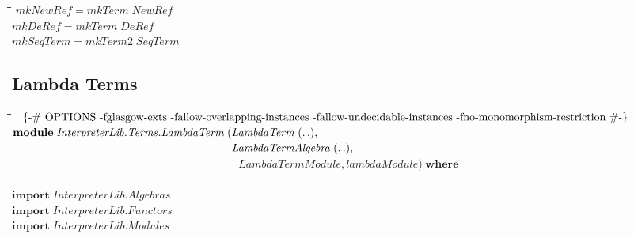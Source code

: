 \documentclass[10pt]{article}
\newlength{\lwidth}\setlength{\lwidth}{4.5cm}
\newlength{\cwidth}\setlength{\cwidth}{8mm} %
\newcommand{\Conid}[1]{\mathit{#1}}
\newcommand{\Varid}[1]{\mathit{#1}}
\begin{document}
\begin{tabbing}
\qquad\=\hspace{\lwidth}\=\hspace{\cwidth}\=\+\kill
${\Varid{mkNewRef}\mathrel{=}\Varid{mkTerm}\;\Conid{NewRef}}$\\
${\Varid{mkDeRef}\mathrel{=}\Varid{mkTerm}\;\Conid{DeRef}}$\\
${\Varid{mkSeqTerm}\mathrel{=}\Varid{mkTerm2}\;\Conid{SeqTerm}}$
\end{tabbing}
\subsection{Lambda Terms}
\begin{tabbing}
\qquad\=\hspace{\lwidth}\=\hspace{\cwidth}\=\+\kill
${\mbox{\enskip\{-\# OPTIONS -fglasgow-exts -fallow-overlapping-instances -fallow-undecidable-instances -fno-monomorphism-restriction  \#-\}\enskip}}$\\
${\mathbf{module}\;\Conid{\Conid{InterpreterLib}.\Conid{Terms}.LambdaTerm}\;(\Conid{LambdaTerm}\;(\mathinner{\ldotp\ldotp}),}$\\
${\phantom{\mathbf{module}\;\Conid{\Conid{InterpreterLib}.\Conid{Terms}.LambdaTerm}\;(\mbox{}}\Conid{LambdaTermAlgebra}\;(\mathinner{\ldotp\ldotp}),}$\\
${\phantom{\mathbf{module}\;\Conid{\Conid{InterpreterLib}.\Conid{Terms}.LambdaTerm}\;(\mbox{}}\Conid{LambdaTermModule},\Varid{lambdaModule})\;\mathbf{where}}$\\
${}$\\
${\mathbf{import}\;\Conid{\Conid{InterpreterLib}.Algebras}}$\\
${\mathbf{import}\;\Conid{\Conid{InterpreterLib}.Functors}}$\\
${\mathbf{import}\;\Conid{\Conid{InterpreterLib}.Modules}}$
\end{tabbing}
\end{document}
